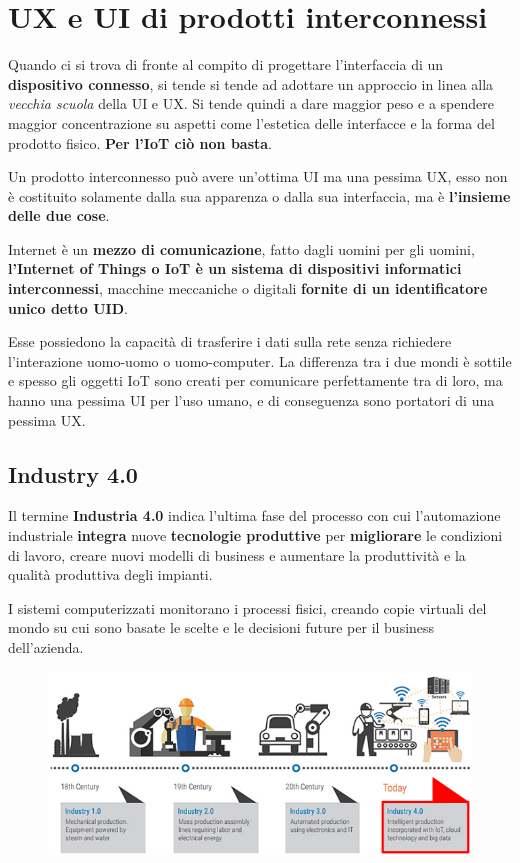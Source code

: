 
\chapter{UX e UI di prodotti interconnessi}

Quando ci si trova di fronte al compito di progettare l'interfaccia di un \textbf{dispositivo
	connesso}, si tende si tende ad adottare un approccio in linea alla \textit{vecchia
	scuola} della UI e UX. Si tende quindi a dare maggior peso e a spendere maggior concentrazione su aspetti come l'estetica delle interfacce e la forma del prodotto fisico. \textbf{Per l'IoT ciò non basta}.

Un prodotto interconnesso può avere un'ottima UI ma una pessima UX, esso non è costituito solamente dalla sua apparenza o dalla sua interfaccia, ma è \textbf{l'insieme delle due cose}.

Internet è un \textbf{mezzo di comunicazione}, fatto dagli uomini per gli uomini, \textbf{l'Internet of Things o IoT è un sistema di dispositivi informatici interconnessi}, macchine meccaniche o digitali \textbf{fornite di un identificatore unico detto UID}.

Esse possiedono la capacità di trasferire i dati sulla rete senza richiedere l'interazione uomo-uomo o uomo-computer.
La differenza tra i due mondi è sottile e spesso gli oggetti IoT sono creati per comunicare perfettamente tra di loro, ma hanno una pessima UI per l'uso umano, e
di conseguenza sono portatori di una pessima UX.

\section{Industry 4.0}

Il termine \textbf{Industria 4.0} indica l'ultima fase del processo con cui l'automazione industriale \textbf{integra} nuove \textbf{tecnologie produttive} per \textbf{migliorare} le condizioni di lavoro, creare nuovi modelli di business e aumentare la produttività e la qualità produttiva degli impianti.

I sistemi computerizzati monitorano i processi fisici, creando copie virtuali del mondo su cui sono basate le scelte e le decisioni future per il business dell'azienda.

\begin{figure}[!h]
	\centering
	\includegraphics[scale=0.7]{../immagini/Industry4.png}
\end{figure}

